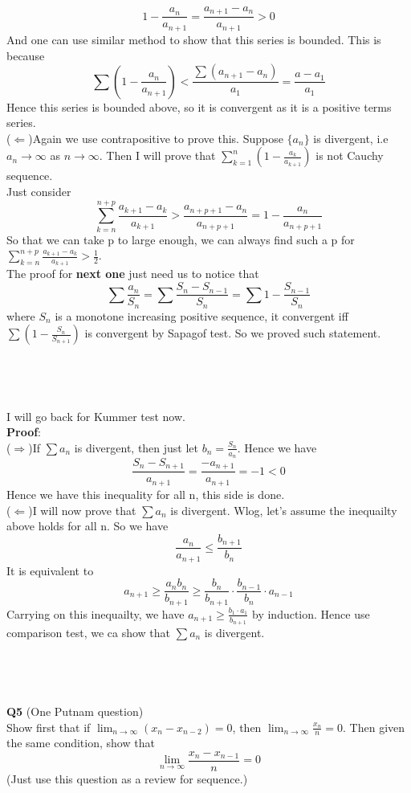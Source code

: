 \documentclass{article}
\begin{document}
$$
1-\frac{a_n}{a_{n+1}} = \frac{a_{n+1}-a_{n}}{a_{n+1}} > 0 
$$
And one can use similar method to show that this series is bounded. This is because
$$
\sum (1-\frac{a_n}{a_{n+1}}) < \frac{\sum (a_{n+1}-a_n)}{a_1} = \frac{a-a_1}{a_1}
$$
Hence this series is bounded above, so it is convergent as it is a positive terms series.\\
($\Longleftarrow$)Again we use contrapositive to prove this. Suppose $\{a_n\}$ is divergent, i.e $a_n \rightarrow \infty$ as $n \rightarrow \infty$. 
Then I will prove that $\sum_{k=1}^{n} (1-\frac{a_k}{a_{k+1}})$ is not Cauchy sequence.\\
Just consider 
$$
\sum_{k=n}^{n+p} \frac{a_{k+1}-a_k}{a_{k+1}} > \frac{a_{n+p+1}-a_n}{a_{n+p+1}} = 1-\frac{a_n}{a_{n+p+1}}
$$
So that we can take p to large enough, we can always find such a p for $\sum_{k=n}^{n+p} \frac{a_{k+1}-a_k}{a_{k+1}} > \frac{1}{2}$.\\
The proof for \textbf{next one} just need us to notice that
$$
\sum \frac{a_n}{S_n} = \sum \frac{S_n-S_{n-1}}{S_n} = \sum 1 - \frac{S_{n-1}}{S_n}
$$
where $S_n$ is a monotone increasing positive sequence, it convergent iff $\sum (1-\frac{S_n}{S_{n+1}})$ is convergent by Sapagof test. So we proved such statement.\\
\\
\\
\\
\\
I will go back for Kummer test now. \\
\textbf{Proof}: \\
($\Longrightarrow$)If $\sum a_n$ is divergent, then just let $b_n = \frac{S_{n}}{a_n}$. Hence we have 
$$
\frac{S_n - S_{n+1}}{a_{n+1}} = \frac{-a_{n+1}}{a_{n+1}} = -1 < 0
$$
Hence we have this inequality for all n, this side is done.\\
($\Longleftarrow$)I will now prove that $\sum a_n$ is divergent. Wlog, let's assume the inequailty above holds for all n.
So we have 
$$
\frac{a_n}{a_{n+1}} \leq \frac{b_{n+1}}{b_{n}}
$$
It is equivalent to
$$
a_{n+1} \geq \frac{a_n b_n}{b_{n+1}} \geq \frac{b_n}{b_{n+1}} \cdot \frac{b_{n-1}}{b_n} \cdot a_{n-1}
$$
Carrying on this inequailty, we have $a_{n+1} \geq \frac{b_1\cdot a_1}{b_{n+1}}$ by induction. Hence use comparison test, we ca show that 
$\sum a_n$ is divergent.\\
\\
\\
\\
\\
\textbf{Q5} (One Putnam question)\\
Show first that if $\lim_{n \to \infty} (x_n - x_{n-2}) = 0$, then $\lim_{n \to \infty} \frac{x_n}{n} = 0$. Then given the same condition, show that
$$
\lim_{n \to \infty} \frac{x_n - x_{n-1}}{n} = 0
$$
(Just use this question as a review for sequence.)
\newpage
\end{document}
